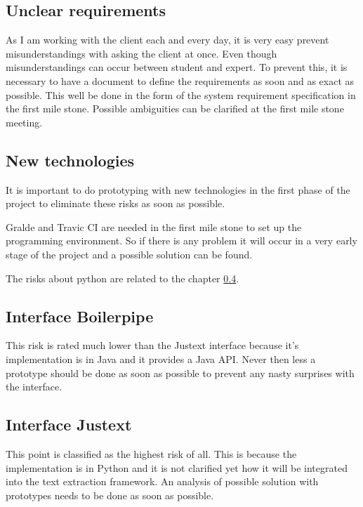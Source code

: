 \subsection{Unclear requirements}

As I am working with the client each and every day, it is very easy prevent misunderstandings with asking the client at once. Even though misunderstandings can occur between student and expert. To prevent this, it is necessary to have a document to define the requirements as soon and as exact as possible. This well be done in the form of the system requirement specification in the first mile stone. Possible ambiguities can be clarified at the first mile stone meeting.

\subsection{New technologies}

It is important to do prototyping with new technologies in the first phase of the project to eliminate these risks as soon as possible.

Gralde and Travic CI are needed in the first mile stone to set up the programming environment. So if there is any problem it will occur in a very early stage of the project and a possible solution can be found.

The risks about python are related to the chapter \ref{subsec:Interface Justext}.

\subsection{Interface Boilerpipe}

This risk is rated much lower than the Justext interface because it's implementation is in Java and it provides a Java API. Never then less a prototype should be done as soon as possible to prevent any nasty surprises with the interface.

\subsection{Interface Justext}
\label{subsec:Interface Justext}

This point is classified as the highest risk of all. This is because the implementation is in Python and it is not clarified yet how it will be integrated into the text extraction framework. An analysis of possible solution with prototypes needs to be done as soon as possible.

